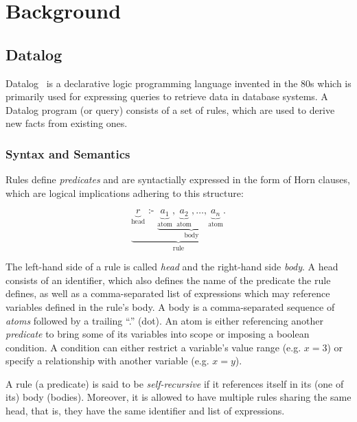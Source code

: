 
\chapter{Background}\label{ch:background}

\section{Datalog}

Datalog~\cite{green2013datalog} is a declarative logic programming language
invented in the 80s which is primarily used for expressing queries to retrieve
data in database systems.
A Datalog program (or query) consists of a set of rules, which are used to
derive new facts from existing ones.

\subsection{Syntax and Semantics}

Rules define \emph{predicates} and are syntactially expressed in the form of
Horn clauses, which are logical implications adhering to this structure:

\begin{equation}
	\underbrace{
	\underbrace{r}_{\text{head}}
	\text{ :- }
	\underbrace{
	\underbrace{a_1}_{\text{atom}},
	\underbrace{a_2}_{\text{atom}},
	\ldots,
	\underbrace{a_n}_{\text{atom}}.
	}_{\text{body}}
	}_{\text{rule}}
\end{equation}

The left-hand side of a rule is called \emph{head} and the right-hand side \emph{body}.
A head consists of an identifier, which also defines the name of the predicate
the rule defines, as well as a comma-separated list of expressions
which may reference variables defined in the rule's body.
A body is a comma-separated sequence of \emph{atoms} followed by a trailing ``.'' (dot).
An atom is either referencing another \emph{predicate} to bring some of its
variables into scope or imposing a boolean condition.
A condition can either restrict a variable's value range (e.g. \(x = 3\))
or specify a relationship with another variable (e.g. \(x = y\)).

A rule (a predicate) is said to be \emph{self-recursive}
if it references itself in its (one of its) body (bodies).
Moreover, it is allowed to have multiple rules sharing the same head, that is,
they have the same identifier and list of expressions.

